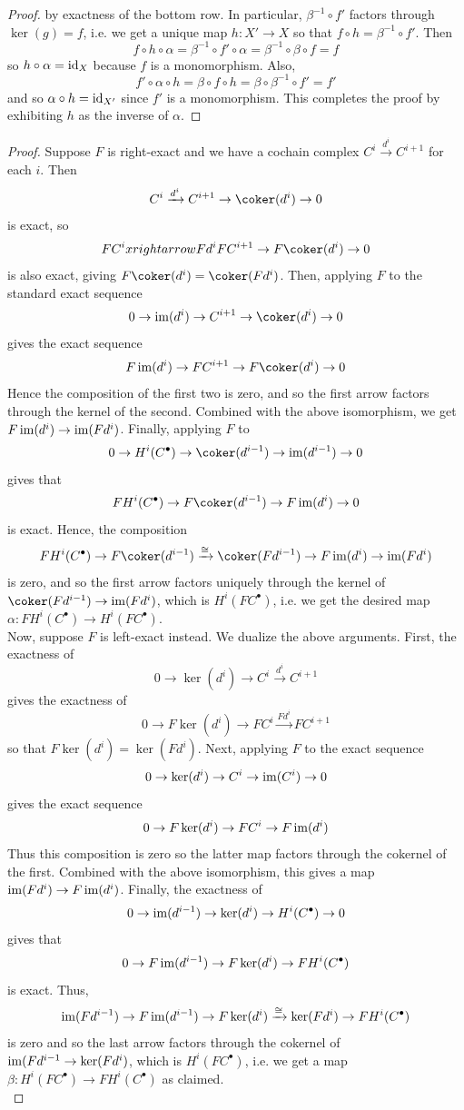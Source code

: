 \documentclass[12pt]{exam}
\begin{document}
\begin{proof}
	by exactness of the bottom row. In particular, $\beta^{-1} \circ f'$ factors through $\ker(g) = f$, i.e. we get a unique map $h : X' \to X$ so that $f \circ h = \beta^{-1} \circ f'$. Then
	\[ f \circ h \circ \alpha = \beta^{-1} \circ f' \circ \alpha = \beta^{-1} \circ \beta \circ f = f \]
	so $h \circ \alpha = \operatorname{id}_X$ because $f$ is a monomorphism. Also,
	\[ f' \circ \alpha \circ h = \beta \circ f \circ h = \beta \circ \beta^{-1} \circ f' = f' \]
	and so $\alpha \circ h = \operatorname{id}_{X'}$ since $f'$ is a monomorphism. This completes the proof by exhibiting $h$ as the inverse of $\alpha$.
\end{proof}

\begin{proof}
	Suppose $F$ is right-exact and we have a cochain complex $C^i \xrightarrow{d^i} C^{i+1}$ for each $i$. Then
	\[ C^i \xrightarrow{d^i} C^{i+1} \to \coker(d^i) \to 0 \]
	is exact, so
	\[ FC^i xrightarrow{Fd^i} FC^{i+1} \to F\coker(d^i) \to 0 \]
	is also exact, giving $F\coker(d^i) = \coker(Fd^i)$. Then, applying $F$ to the standard exact sequence
	\[ 0 \to \im(d^i) \to C^{i+1} \to \coker(d^i) \to 0 \]
	gives the exact sequence
	\[ F\im(d^i) \to FC^{i+1} \to F\coker(d^i) \to 0 \]
	Hence the composition of the first two is zero, and so the first arrow factors through the kernel of the second. Combined with the above isomorphism, we get $F\operatorname{im}(d^i) \to \operatorname{im}(Fd^i)$. Finally, applying $F$ to
	\[ 0 \to H^i(C^\bullet) \to \coker(d^{i-1}) \to \im(d^{i-1}) \to 0 \]
	gives that
	\[ FH^i(C^\bullet) \to F\coker(d^{i-1}) \to F\im(d^i) \to 0 \]
	is exact. Hence, the composition
	\[ FH^i(C^\bullet) \to F\coker(d^{i-1}) \xrightarrow{\cong} \coker(Fd^{i-1}) \to F\im(d^i) \to \im(Fd^i) \]
	is zero, and so the first arrow factors uniquely through the kernel of $\coker(Fd^{i-1}) \to \im(Fd^i)$, which is $H^i(FC^\bullet)$, i.e. we get the desired map $\alpha : FH^i(C^\bullet) \to H^i(FC^\bullet)$. \\
	
	Now, suppose $F$ is left-exact instead. We dualize the above arguments. First, the exactness of
	\[ 0 \to \ker(d^i) \to C^i \xrightarrow{d^i} C^{i+1} \]
	gives the exactness of
	\[ 0 \to F\ker(d^i) \to FC^i \xrightarrow{Fd^i} FC^{i+1} \]
	so that $F\ker(d^i) = \ker(Fd^i)$. Next, applying $F$ to the exact sequence
	\[ 0 \to \ker(d^i) \to C^i \to \operatorname{im}(C^i) \to 0 \]
	gives the exact sequence
	\[ 0 \to F\ker(d^i) \to FC^i \to F\operatorname{im}(d^i) \]
	Thus this composition is zero so the latter map factors through the cokernel of the first. Combined with the above isomorphism, this gives a map $\operatorname{im}(Fd^i) \to F\operatorname{im}(d^i)$. Finally, the exactness of
	\[ 0 \to \operatorname{im}(d^{i-1}) \to \ker(d^i) \to H^i(C^\bullet) \to 0 \]
	gives that
	\[ 0 \to F\operatorname{im}(d^{i-1}) \to F\ker(d^i) \to FH^i(C^\bullet) \]
	is exact. Thus,
	\[ \operatorname{im}(Fd^{i-1}) \to F\operatorname{im}(d^{i-1}) \to F\ker(d^i) \xrightarrow{\cong} \ker(Fd^i) \to FH^i(C^\bullet) \]
	is zero and so the last arrow factors through the cokernel of $\operatorname{im}(Fd^{i-1} \to \ker(Fd^i)$, which is $H^i(FC^\bullet)$, i.e. we get a map $\beta : H^i(FC^\bullet) \to FH^i(C^\bullet)$ as claimed. \\
	

\end{proof}
\end{document}
